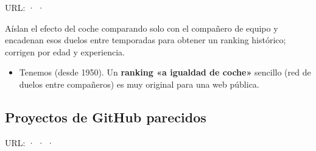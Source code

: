 URL: \href{https://f1metrics.wordpress.com/2019/11/22/the-f1metrics-top-100/}{} · \href{https://f1mathematicalmodel.com/2026/08/17/2026-mid-season-f1-driver-ratings/}{} · \href{https://f1-analysis.com/2025/12/09/f1-2025-mathematical-driver-rankings/}{}

Aíslan el efecto del coche comparando solo con el compañero de equipo y encadenan esos duelos entre temporadas para obtener un ranking histórico; corrigen por edad y experiencia.

\begin{itemize}
\item \si{} Tenemos  (desde 1950). Un \textbf{ranking «a igualdad de coche»} sencillo (red de duelos entre compañeros) es muy original para una web pública.
\end{itemize}

\subsection{Proyectos de GitHub parecidos}

URL: \href{https://github.com/hugoogb/f1-tracker}{} · \href{https://github.com/gaurab6969/F1-ErgastEra-Archive}{} · \href{https://github.com/PeterCollavino7/f1-analysis}{} · \href{https://github.com/smit-sms/Formula-One-Data-Visualization-Dashboard}{}

